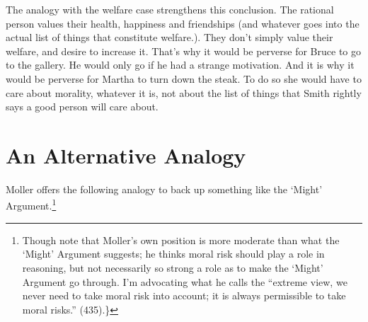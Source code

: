 The analogy with the welfare case strengthens this conclusion. The rational person values their health, happiness and friendships (and whatever goes into the actual list of things that constitute welfare.). They don't simply value their welfare, and desire to increase it. That's why it would be perverse for Bruce to go to the gallery. He would only go if he had a strange motivation. And it is why it would be perverse for Martha to turn down the steak. To do so she would have to care about morality, whatever it is, not about the list of things that Smith rightly says a good person will care about.

\section{An Alternative Analogy}
\label{analternativeanalogy}

Moller offers the following analogy to back up something like the `Might' Argument.\footnote{Though note that Moller's own position is more moderate than what the `Might' Argument suggests; he thinks moral risk should play a role in reasoning, but not necessarily so strong a role as to make the `Might' Argument go through. I'm advocating what he calls the ``extreme view, we never need to take moral risk into account; it is always permissible to take moral risks.'' (435).\}}

